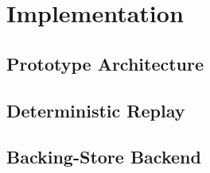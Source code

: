 \section{Implementation}
\label{sec:implementation}


\subsection{Prototype Architecture}
\label{sec:implementation:proto}


\subsection{Deterministic Replay}
\label{sec:implementation:determinism}


\subsection{Backing-Store Backend}
\label{sec:implementation:backing}

